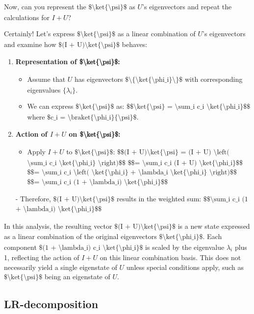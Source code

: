 \begin{ai}
Now, can you represent the $\ket{\psi}$ as $U$'s eigenvectors and repeat the calculations for $I+U$?
\end{ai}

\begin{airesult}
Certainly! Let's express \(\ket{\psi}\) as a linear combination of \(U\)'s eigenvectors and examine
how \((I + U)\ket{\psi}\) behaves:

\begin{enumerate}

\item \textbf{Representation of \(\ket{\psi}\):}
  \begin{itemize}
  \item Assume that \(U\) has eigenvectors \(\{\ket{\phi_i}\}\) with corresponding eigenvalues
\(\{\lambda_i\}\).
  \item We can express \(\ket{\psi}\) as:
    \[
    \ket{\psi} = \sum_i c_i \ket{\phi_i}
    \]
    where \(c_i = \braket{\phi_i}{\psi}\).
  \end{itemize}

\item \textbf{Action of \(I + U\) on \(\ket{\psi}\):}
  \begin{itemize}
  \item Apply \(I + U\) to \(\ket{\psi}\):
    \[
    (I + U)\ket{\psi} = (I + U) \left( \sum_i c_i \ket{\phi_i} \right)
    \]
    \[
    = \sum_i c_i (I + U) \ket{\phi_i}
    \]
    \[
    = \sum_i c_i \left( \ket{\phi_i} + \lambda_i \ket{\phi_i} \right)
    \]
    \[
    = \sum_i c_i (1 + \lambda_i) \ket{\phi_i}
    \]
  \end{itemize}
  - Therefore, \((I + U)\ket{\psi}\) results in the weighted sum:
    \[
    \sum_i c_i (1 + \lambda_i) \ket{\phi_i}
    \]

\end{enumerate}

In this analysis, the resulting vector \((I + U)\ket{\psi}\) is a new state expressed as a linear
combination of the original eigenvectors \(\ket{\phi_i}\). Each component \((1 + \lambda_i) c_i
\ket{\phi_i}\) is scaled by the eigenvalue \(\lambda_i\) plus 1, reflecting the action of \(I + U\)
on this linear combination basis. This does not necessarily yield a single eigenstate of \(U\)
unless special conditions apply, such as \(\ket{\psi}\) being an eigenstate of \(U\).
\end{airesult}


\subsection{LR-decomposition}


